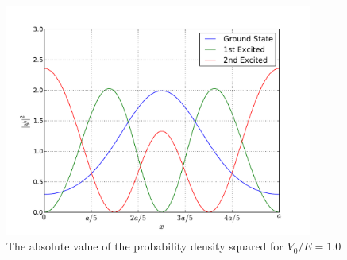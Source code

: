 \documentclass[11pt,a4paper]{article}
\begin{document}
\begin{figure}[t]
\centering
\includegraphics[width=0.9\textwidth]{prob_density/first3states.pdf}
\caption{The absolute value of the probability density squared for $V_0/E = 1.0$} \label{fig:psi1}
\end{figure}
\end{document}
